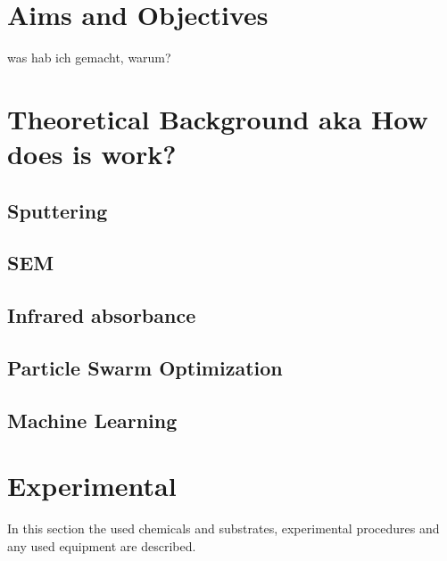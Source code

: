 \documentclass[a4paper]{article}
\begin{document}
\section{Aims and Objectives}
was hab ich gemacht, warum? 

\section{Theoretical Background aka How does is work?}
\subsection{Sputtering}
\subsection{SEM}
\subsection{Infrared absorbance}
\subsection{Particle Swarm Optimization}
\subsection{Machine Learning}

\section{Experimental}
\label{sec:exp}
In this section the used chemicals and substrates, experimental procedures and any used equipment are described. 
\end{document}
